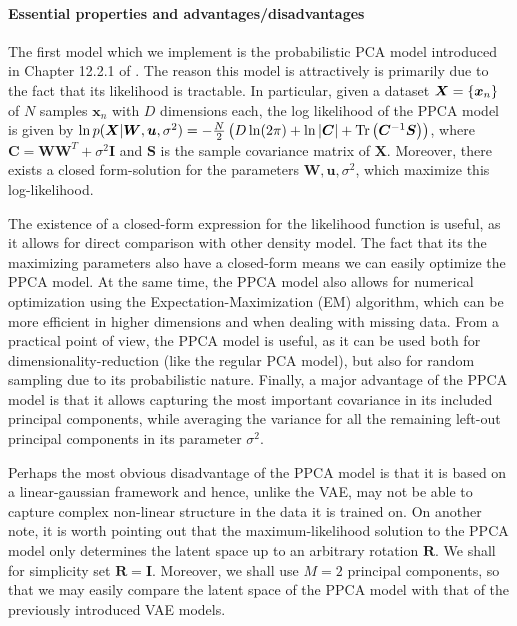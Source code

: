 \paragraph{Essential properties and advantages/disadvantages}
The first model which we implement is the probabilistic PCA model introduced in Chapter 12.2.1 of \citep{bishop2006pattern}. The reason this model is attractively is primarily due to the fact that its likelihood is tractable. In particular, given a dataset $\bm{X} = \left \{\bm{x}_n\right\}$ of $N$ samples $\bm{x}_n$ with $D$ dimensions each, the log likelihood of the PPCA model is given by $\ln p(\bm{X}|\bm{W}, \bm{u}, \sigma^2) = -\frac{N}{2}\left (D \ln(2\pi) + \ln \left |\bm{C}\right| + \text{Tr}\left (\bm{C}^{-1}\bm{S}\right)\right)$, where $\bm{C} = \bm{W}\bm{W}^T + \sigma^2 \bm{I}$ and $\bm{S}$ is the sample covariance matrix of $\bm{X}$. Moreover, there exists a closed form-solution for the parameters $\bm{W}, \bm{u}, \sigma^2$, which maximize this log-likelihood. 

The existence of a closed-form expression for the likelihood function is useful, as it allows for direct comparison with other density model. The fact that its the maximizing parameters also have a closed-form means we can easily optimize the PPCA model. At the same time, the PPCA model also allows for numerical optimization using the Expectation-Maximization (EM) algorithm, which can be more efficient in higher dimensions and when dealing with missing data. From a practical point of view, the PPCA model is useful, as it can be used both for dimensionality-reduction (like the regular PCA model), but also for random sampling due to its probabilistic nature. Finally, a major advantage of the PPCA model is that it allows capturing the most important covariance in its included principal components, while averaging the variance for all the remaining left-out principal components in its parameter $\sigma^2$. 

Perhaps the most obvious disadvantage of the PPCA model is that it is based on a linear-gaussian framework and hence, unlike the VAE, may not be able to capture complex non-linear structure in the data it is trained on. On another note, it is worth pointing out that the maximum-likelihood solution to the PPCA model only determines the latent space up to an arbitrary rotation $\bm{R}$. We shall for simplicity set $\bm{R} = \bm{I}$. Moreover, we shall use $M=2$ principal components, so that we may easily compare the latent space of the PPCA model with that of the previously introduced VAE models.